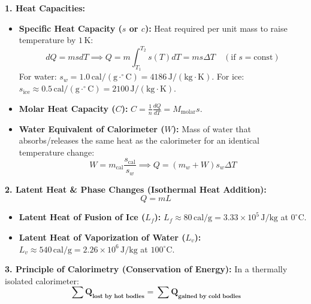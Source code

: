 \documentclass[10pt,a4paper]{article}
\begin{document}
\begin{formulabox}
\textbf{1. Heat Capacities:}
\begin{itemize}
  \item \textbf{Specific Heat Capacity ($s$ or $c$):} Heat required per unit mass to raise temperature by $1\,\mathrm{K}$:
  \begin{equation}
    dQ = m s dT \implies Q = m \int_{T_1}^{T_2} s(T) dT = m s \Delta T \quad (\text{if } s = \text{const})
  \end{equation}
  For water: $s_w = 1.0\,\mathrm{cal}/(\mathrm{g}\cdot^\circ\mathrm{C}) = 4186\,\mathrm{J}/(\mathrm{kg}\cdot\mathrm{K})$. For ice: $s_{\text{ice}} \approx 0.5\,\mathrm{cal}/(\mathrm{g}\cdot^\circ\mathrm{C}) = 2100\,\mathrm{J}/(\mathrm{kg}\cdot\mathrm{K})$.
  \item \textbf{Molar Heat Capacity ($C$):} $C = \frac{1}{n}\frac{dQ}{dT} = M_{\text{molar}} s$.
  \item \textbf{Water Equivalent of Calorimeter ($W$):} Mass of water that absorbs/releases the same heat as the calorimeter for an identical temperature change:
  \begin{equation}
    W = m_{\text{cal}} \frac{s_{\text{cal}}}{s_w} \implies Q = (m_w + W) s_w \Delta T
  \end{equation}
\end{itemize}
\textbf{2. Latent Heat \& Phase Changes (Isothermal Heat Addition):}
\begin{equation}
  Q = m L
\end{equation}
\begin{itemize}
  \item \textbf{Latent Heat of Fusion of Ice ($L_f$):} $L_f \approx 80\,\mathrm{cal}/\mathrm{g} = 3.33 \times 10^5\,\mathrm{J}/\mathrm{kg}$ at $0^\circ\mathrm{C}$.
  \item \textbf{Latent Heat of Vaporization of Water ($L_v$):} $L_v \approx 540\,\mathrm{cal}/\mathrm{g} = 2.26 \times 10^6\,\mathrm{J}/\mathrm{kg}$ at $100^\circ\mathrm{C}$.
\end{itemize}
\textbf{3. Principle of Calorimetry (Conservation of Energy):}
In a thermally isolated calorimeter:
\begin{equation}
  \mathbf{\sum Q_{\text{lost by hot bodies}} = \sum Q_{\text{gained by cold bodies}}}
\end{equation}
\end{formulabox}
\end{document}
